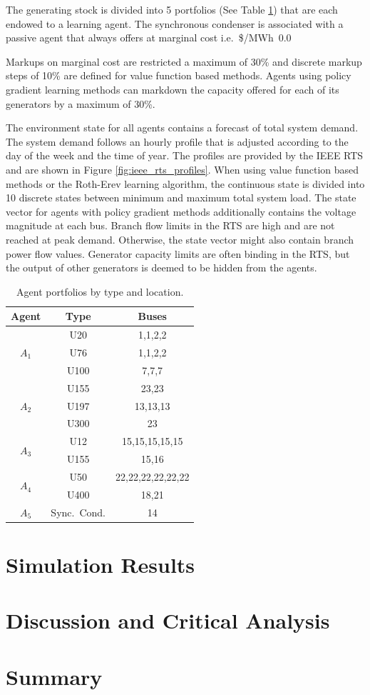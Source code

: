 The generating stock is divided into 5 portfolios (See Table
\ref{tbl:agent_portfolios}) that are each endowed to a learning agent.  The
synchronous condenser is associated with a passive agent that always offers
at marginal cost i.e.~\$/MWh~$0.0$

Markups on marginal cost are restricted a maximum of 30\% and discrete markup
steps of 10\% are defined for value function based methods.  Agents using
policy gradient learning methods can markdown the capacity offered for each of
its generators by a maximum of 30\%.

The environment state for all agents contains a forecast of total system
demand.  The system demand follows an hourly profile that is adjusted according
to the day of the week and the time of year.  The profiles are provided by the
IEEE RTS and are shown in Figure \ref{fig:ieee_rts_profiles}.  When using
value function based methods or the Roth-Erev learning algorithm, the
continuous state is divided into 10 discrete states between minimum and maximum
total system load.  The state vector for agents with policy gradient methods
additionally contains the voltage magnitude at each bus.  Branch flow limits in
the RTS are high and are not reached at peak demand.  Otherwise, the state
vector might also contain branch power flow values.  Generator capacity limits
are often binding in the RTS, but the output of other generators is deemed to
be hidden from the agents.

\begin{table}
\begin{center}
\begin{tabular}{c|c|c}
\hline
Agent &Type &\multicolumn{1}{c}{Buses} \\
\hline\hline
\multirow{3}{*}{$A_1$} &U20 &1,1,2,2 \\
 & U76 &1,1,2,2 \\
 & U100 &7,7,7\\
\hline
\multirow{3}{*}{$A_2$} &U155 &23,23 \\
 & U197 &13,13,13 \\
 & U300 &23 \\
\hline
\multirow{2}{*}{$A_3$} &U12 &15,15,15,15,15 \\
 & U155 &15,16 \\
\hline
\multirow{2}{*}{$A_4$} &U50 &22,22,22,22,22,22 \\
 & U400 &18,21 \\
\hline
$A_5$ & Sync.~Cond. &14 \\
\hline
\end{tabular}
\caption{Agent portfolios by type and location.}
\label{tbl:agent_portfolios}
\end{center}
\end{table}

%

\section{Simulation Results}
\section{Discussion and Critical Analysis}
\label{sec:discuss}
\section{Summary}
